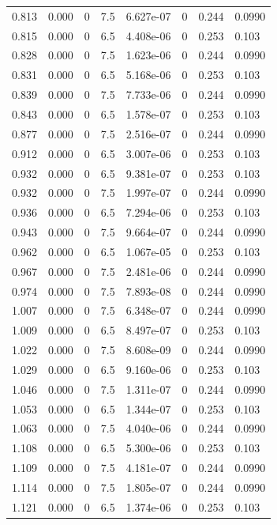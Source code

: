 \documentclass[preview]{standalone}
\begin{document}
{{{\begin{tabular}{L{1.2cm}C{1.2cm} C{0.3cm}C{0.5cm} C{1.4cm}C{1.4cm} C{1.4cm}C{1.4cm}}
  0.813  &  0.000  & 0     & 7.5 &  6.627e-07  & 0  & 0.244 &  0.0990   \\ 
  0.815  &  0.000  & 0     & 6.5 &  4.408e-06  & 0  & 0.253 &  0.103   \\ 
  0.828  &  0.000  & 0     & 7.5 &  1.623e-06  & 0  & 0.244 &  0.0990   \\ 
  0.831  &  0.000  & 0     & 6.5 &  5.168e-06  & 0  & 0.253 &  0.103   \\ 
  0.839  &  0.000  & 0     & 7.5 &  7.733e-06  & 0  & 0.244 &  0.0990   \\ 
  0.843  &  0.000  & 0     & 6.5 &  1.578e-07  & 0  & 0.253 &  0.103   \\ 
  0.877  &  0.000  & 0     & 7.5 &  2.516e-07  & 0  & 0.244 &  0.0990   \\ 
  0.912  &  0.000  & 0     & 6.5 &  3.007e-06  & 0  & 0.253 &  0.103   \\ 
  0.932  &  0.000  & 0     & 6.5 &  9.381e-07  & 0  & 0.253 &  0.103   \\ 
  0.932  &  0.000  & 0     & 7.5 &  1.997e-07  & 0  & 0.244 &  0.0990   \\ 
  0.936  &  0.000  & 0     & 6.5 &  7.294e-06  & 0  & 0.253 &  0.103   \\ 
  0.943  &  0.000  & 0     & 7.5 &  9.664e-07  & 0  & 0.244 &  0.0990   \\ 
  0.962  &  0.000  & 0     & 6.5 &  1.067e-05  & 0  & 0.253 &  0.103   \\ 
  0.967  &  0.000  & 0     & 7.5 &  2.481e-06  & 0  & 0.244 &  0.0990   \\ 
  0.974  &  0.000  & 0     & 7.5 &  7.893e-08  & 0  & 0.244 &  0.0990   \\ 
  1.007  &  0.000  & 0     & 7.5 &  6.348e-07  & 0  & 0.244 &  0.0990   \\ 
  1.009  &  0.000  & 0     & 6.5 &  8.497e-07  & 0  & 0.253 &  0.103   \\ 
  1.022  &  0.000  & 0     & 7.5 &  8.608e-09  & 0  & 0.244 &  0.0990   \\ 
  1.029  &  0.000  & 0     & 6.5 &  9.160e-06  & 0  & 0.253 &  0.103   \\ 
  1.046  &  0.000  & 0     & 7.5 &  1.311e-07  & 0  & 0.244 &  0.0990   \\ 
  1.053  &  0.000  & 0     & 6.5 &  1.344e-07  & 0  & 0.253 &  0.103   \\ 
  1.063  &  0.000  & 0     & 7.5 &  4.040e-06  & 0  & 0.244 &  0.0990   \\ 
  1.108  &  0.000  & 0     & 6.5 &  5.300e-06  & 0  & 0.253 &  0.103   \\ 
  1.109  &  0.000  & 0     & 7.5 &  4.181e-07  & 0  & 0.244 &  0.0990   \\ 
  1.114  &  0.000  & 0     & 7.5 &  1.805e-07  & 0  & 0.244 &  0.0990   \\ 
  1.121  &  0.000  & 0     & 6.5 &  1.374e-06  & 0  & 0.253 &  0.103   \\ 
\hline 
\end{tabular} 

}}}
\end{document}
